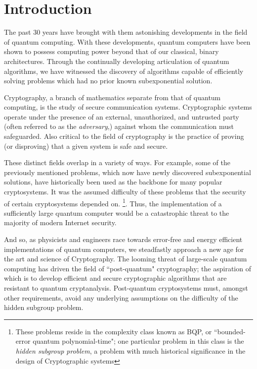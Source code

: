 \chapter{Introduction}

The past 30 years have brought with them astonishing developments in the field of quantum computing. With these developments, quantum computers have been shown to possess computing power beyond that of our classical, binary architectures. Through the continually developing articulation of quantum algorithms, we have witnessed the discovery of algorithms capable of efficiently solving problems which had no prior known subexponential solution. 

Cryptography, a branch of mathematics separate from that of quantum computing, is the study of secure communication systems. Cryptographic systems operate under the presence of an external, unauthorized, and untrusted party (often referred to as the \textit{adversary},) against whom the communication must safeguarded. Also critical to the field of cryptography is the practice of proving (or disproving) that a given system is safe and secure.

These distinct fields overlap in a variety of ways. For example, some of the previously mentioned problems, which now have newly discovered subexponential solutions, have historically been used as the backbone for many popular cryptosystems. It was the assumed difficulty of these problems that the security of certain cryptosystems depended on. \footnote{These problems reside in the complexity class known as BQP, or ``bounded-error quantum polynomial-time"; one particular problem in this class is the \textit{hidden subgroup problem}, a problem with much historical significance in the design of Cryptographic systems}. Thus, the implementation of a sufficiently large quantum computer would be a catastrophic threat to the majority of modern Internet security.  

And so, as physicists and engineers race towards error-free and energy efficient implementations of quantum computers, we steadfastly approach a new age for the art and science of Cryptography. The looming threat of large-scale quantum computing has driven the field of ``post-quantum" cryptography; the aspiration of which is to develop efficient and secure cryptographic algorithms that are resistant to quantum cryptanalysis. Post-quantum cryptosystems must, amongst other requirements, avoid any underlying assumptions on the difficulty of the hidden subgroup problem.\\

